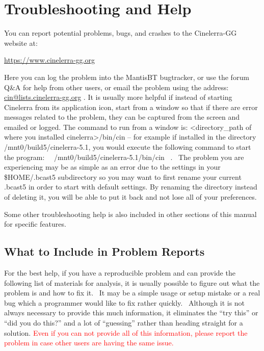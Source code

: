 \chapter{Troubleshooting and Help}%
\label{cha:Troubleshooting and Help}

You can report potential problems, bugs, and crashes to the Cinelerra-GG website at:
\medskip

\hspace{10mm}\href{https://www.cinelerra-gg.org/}{https://www.cinelerra-gg.org}
\medskip

Here you can log the problem into the MantisBT bugtracker, or use the forum Q\&A for help from other users, or email the
problem using the address: \href{mailto:cin@lists.cinelerra-gg.org}{cin@lists.cinelerra-gg.org} . It is usually more
helpful if instead of starting Cinelerra from its application icon, start from a window so that if there are error
messages related to the problem, they can be captured from the screen and emailed or logged. The command to run
from a window is: {\textless}directory\_path of where you installed cinelerra{\textgreater}/bin/cin -- for example if
installed in the directory /mnt0/build5/cinelerra-5.1, you would execute the following command to start the program:
\ \ /mnt0/build5/cinelerra-5.1/bin/cin \ . \ The problem you are experiencing may be as simple as an error due to the
settings in your \$HOME/.bcast5 subdirectory so you may want to first rename your current .bcast5 in order to start
with default settings. By renaming the directory instead of deleting it, you will be able to put it back and not lose
all of your preferences.
\medskip

Some other troubleshooting help is also included in other sections of this manual for specific features.

\section{What to Include in Problem Reports}%
\label{cha:What to Include in Problem Reports}
For the best help, if you have a reproducible problem and can provide the following list of materials for analysis, it
is usually possible to figure out what the problem is and how to fix it. \ It may be a simple usage or setup mistake or
a real bug which a programmer would like to fix rather quickly. \ Although it is not always necessary to provide this
much information, it eliminates the ``try this'' or ``did you do this?'' and a lot of ``guessing'' rather than heading
straight for a solution. \textcolor{red}{Even if you can not provide all of this information, please report the problem in case other users are having the same issue.}
\medskip

